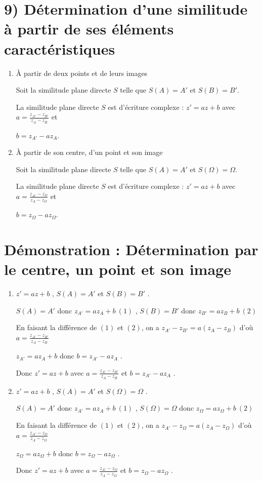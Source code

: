 \documentclass[12pt,a4paper]{article}
\begin{document}
\section*{9) Détermination d'une similitude à partir de ses éléments caractéristiques}
\begin{enumerate}
\item  À partir de deux points et de leurs images

Soit la similitude plane directe $S$ telle que $S(A) = A'$ et $S(B) = B'$.

La similitude plane directe $S$ est d'écriture complexe : $z' = az + b$ avec $a = \frac{z_{A'} - z_{B'}}{z_A - z_B}$ et

$b = z_{A'} - az_A$.

\item À partir de son centre, d'un point et son image

Soit la similitude plane directe $S$ telle que $S(A) = A'$ et $S(\Omega) = \Omega$.

La similitude plane directe $S$ est d'écriture complexe : $z' = az + b$ avec $a = \frac{z_{A'} - z_{\Omega}}{z_A - z_{\Omega}}$ et

$b = z_{\Omega} - az_{\Omega}$.
\end{enumerate}

\section*{Démonstration : Détermination par le centre, un point et son image}
\begin{enumerate}
\item
$z' = az + b$ , $S(A) = A'$ et $S(B) = B'$ .

$S(A) = A'$ donc $z_{A'} = az_A + b \ (1)$ , $S(B) = B'$ donc $z_{B'} = az_B + b \ (2)$

En faisant la différence de $(1)$ et $(2)$, on a $z_{A'} - z_{B'} = a(z_A - z_B)$ d'où $a = \frac{z_{A'} - z_{B'}}{z_A - z_B}$

$z_{A'} = az_A + b$ donc $b = z_{A'} - az_A$ .

Donc $z' = az + b$ avec $a = \frac{z_{A'} - z_{B'}}{z_A - z_B}$ et $b = z_{A'} - az_A$ .

\item

$z' = az + b$ , $S(A) = A'$ et $S(\Omega) = \Omega$ .

$S(A) = A'$ donc $z_{A'} = az_A + b \ (1)$ , $S(\Omega) = \Omega$ donc $z_{\Omega} = az_{\Omega} + b \ (2)$

En faisant la différence de $(1)$ et $(2)$, on a $z_{A'} - z_{\Omega} = a(z_A - z_{\Omega})$ d'où $a = \frac{z_{A'} - z_{\Omega}}{z_A - z_{\Omega}}$

$z_{\Omega} = az_{\Omega} + b$ donc $b = z_{\Omega} - az_{\Omega}$ .

Donc $z' = az + b$ avec $a = \frac{z_{A'} - z_{\Omega}}{z_A - z_{\Omega}}$ et $b = z_{\Omega} - az_{\Omega}$ .
\end{enumerate}
\end{document}
